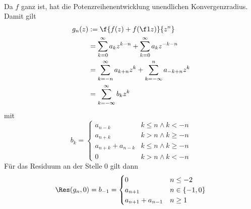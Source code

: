 \documentclass{mywork}
\begin{document}
	\begin{aufgabe}~

		Da $f$ ganz ist, hat die Potenzreihenentwicklung unendlichen Konvergenzradius.
		Damit gilt
		\begin{align*}
			g_n(z) 
			&:= \f {f(z) + f(\f 1z)}{z^n} \\
			&= \sum_{k=0}^\infty a_k z^{k-n} + \sum_{k=0}^\infty a_k z^{-k-n} \\
			&= \sum_{k=-n}^\infty a_{k+n}z^k + \sum_{k=-\infty}^n a_{-k+n} z^k \\
			&= \sum_{k=-\infty}^\infty b_k z^k
		\end{align*}
		mit
		\[
			b_k = \begin{cases}
				a_{n-k} & k \le n \land k < -n \\
				a_{n+k} & k > n \land k \ge -n \\
				a_{n+k} + a_{n-k} & k \le n \land k \ge -n \\
				0 & k > n \land k < -n
			\end{cases}
		\]
		Für das Residuum an der Stelle $0$ gilt dann
		\[
			\Res(g_n, 0) = b_{-1} = \begin{cases}
				0 & n \le -2 \\
				a_{n+1} & n \in \{-1,0\} \\
				a_{n+1} + a_{n-1} & n \ge 1
			\end{cases}
		\]


	\end{aufgabe}
\end{document}
